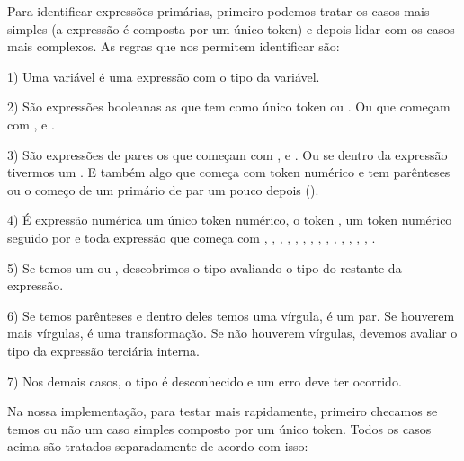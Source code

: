 {Para identificar expressões primárias, primeiro podemos tratar os
casos mais simples (a expressão é composta por um único token) e
depois lidar com os casos mais complexos. As regras que nos permitem
identificar são:

1) Uma variável é uma expressão com o tipo da variável.

2) São expressões booleanas as que tem como único
token  ou . Ou que começam
com ,  e
.

3) São expressões de pares os que começam
com , 
e . Ou se dentro da expressão tivermos
um \monoespaco{[}. E também algo que começa com token numérico e tem
parênteses ou o começo de um primário de par um pouco depois
().

4) É expressão numérica um único token numérico, o
token , um token numérico seguido
por \monoespaco{/} e toda expressão que começa
com , , , ,
, , , ,
, , , ,
, , .

5) Se temos um \monoespaco{+} ou \monoespaco{-}, descobrimos o tipo
avaliando o tipo do restante da expressão.

6) Se temos parênteses e dentro deles temos uma vírgula, é um par. Se
houverem mais vírgulas, é uma transformação. Se não houverem vírgulas,
devemos avaliar o tipo da expressão terciária interna.

7) Nos demais casos, o tipo é desconhecido e um erro deve ter ocorrido.

Na nossa implementação, para testar mais rapidamente, primeiro
checamos se temos ou não um caso simples composto por um único
token. Todos os casos acima são tratados separadamente de acordo com
isso:

}
